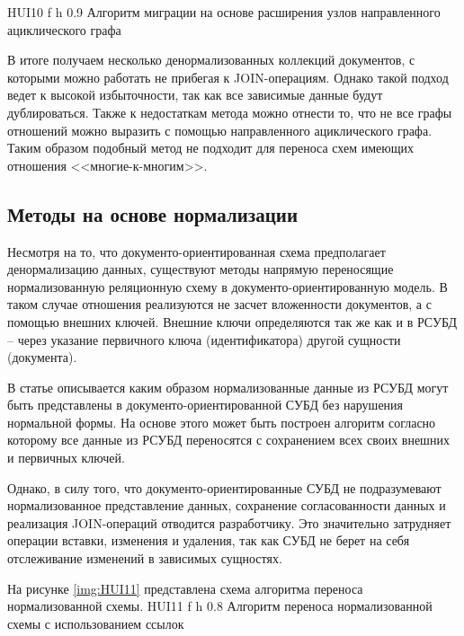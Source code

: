 \clearpage

    {HUI10} %
    {f} %
    {h} %
    {0.9\textwidth} %
    {Алгоритм миграции на основе расширения узлов направленного ациклического графа} %
    
В итоге получаем несколько денормализованных коллекций документов, с которыми можно работать не прибегая к JOIN-операциям.
Однако такой подход ведет к высокой избыточности, так как все зависимые данные будут дублироваться.
Также к недостаткам метода можно отнести то, что не все графы отношений можно выразить с помощью направленного ациклического графа.
Таким образом подобный метод не подходит для переноса схем имеющих отношения <<многие-к-многим>>. 

\clearpage
\subsection{Методы на основе нормализации}
Несмотря на то, что документо-ориентированная схема предполагает денормализацию данных,
существуют методы напрямую переносящие нормализованную реляционную схему в документо-ориентированную модель.
В таком случае отношения реализуются не засчет вложенности документов, а с помощью внешних ключей.
Внешние ключи определяются так же как и в РСУБД -- через указание первичного ключа (идентификатора) другой сущности (документа).

В статье \cite{reference} описывается каким образом нормализованные данные из РСУБД могут быть представлены в документо-ориентированной СУБД без нарушения нормальной формы.
На основе этого может быть построен алгоритм согласно которому все данные из РСУБД переносятся с сохранением всех своих внешних и первичных ключей.

Однако, в силу того, что документо-ориентированные СУБД не подразумевают нормализованное представление данных, сохранение согласованности данных и реализация JOIN-операций отводится разработчику.
Это значительно затрудняет операции вставки, изменения и удаления, так как СУБД не берет на себя отслеживание изменений в зависимых сущностях. 

\clearpage
На рисунке \ref{img:HUI11} представлена схема алгоритма переноса нормализованной схемы.
    {HUI11} %
    {f} %
    {h} %
    {0.8\textwidth} %
    {Алгоритм переноса нормализованной схемы с использованием ссылок} %

